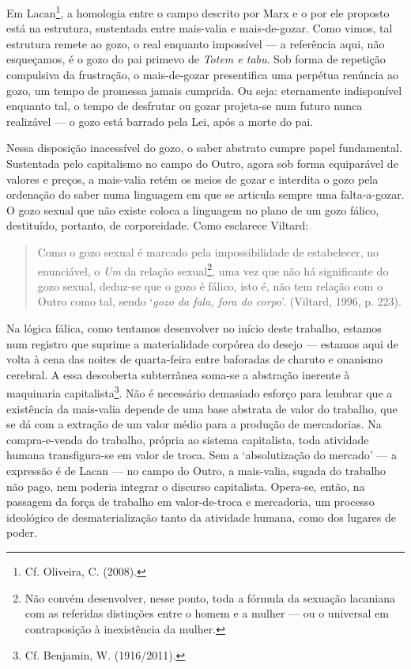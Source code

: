 Em Lacan\footnote{Cf. Oliveira, C. (2008).}, a homologia entre o campo
descrito por Marx e o por ele proposto está na estrutura, sustentada
entre mais-valia e mais-de-gozar. Como vimos, tal estrutura remete ao
gozo, o real enquanto impossível --- a referência aqui, não esqueçamos, é
o gozo do pai primevo de \emph{Totem e tabu}. Sob forma de repetição
compulsiva da frustração, o mais-de-gozar presentifica uma perpétua
renúncia ao gozo, um tempo de promessa jamais cumprida. Ou seja:
eternamente indisponível enquanto tal, o tempo de desfrutar ou gozar
projeta-se num futuro nunca realizável --- o gozo está barrado pela Lei,
após a morte do pai.

Nessa disposição inacessível do gozo, o saber abstrato cumpre papel
fundamental. Sustentada pelo capitalismo no campo do Outro, agora sob
forma equiparável de valores e preços, a mais-valia retém os meios de
gozar e interdita o gozo pela ordenação do saber numa linguagem em que
se articula sempre uma falta-a-gozar. O gozo sexual que não existe
coloca a linguagem no plano de um gozo fálico, destituído, portanto, de
corporeidade. Como esclarece Viltard:

\begin{quote}
Como o gozo sexual é marcado pela impossibilidade de estabelecer, no
enunciável, o \emph{Um} da relação sexual\footnote{Não convém
  desenvolver, nesse ponto, toda a fórmula da sexuação lacaniana com as
  referidas distinções entre o homem e a mulher --- ou o universal em
  contraposição à inexistência da mulher.}, uma vez que não há
significante do gozo sexual, deduz-se que o gozo é fálico, isto é, não
tem relação com o Outro como tal, sendo `\emph{gozo da fala, fora do
corpo}'. (Viltard, 1996, p. 223).
\end{quote}

Na lógica fálica, como tentamos desenvolver no início deste trabalho,
estamos num registro que suprime a materialidade corpórea do desejo ---
estamos aqui de volta à cena das noites de quarta-feira entre baforadas
de charuto e onanismo cerebral. A essa descoberta subterrânea soma-se a
abstração inerente à maquinaria capitalista\footnote{Cf. Benjamin, W.
  (1916/2011).}. Não é necessário demasiado esforço para lembrar que a
existência da mais-valia depende de uma base abstrata de valor do
trabalho, que se dá com a extração de um valor médio para a produção de
mercadorias. Na compra-e-venda do trabalho, própria ao sistema
capitalista, toda atividade humana transfigura-se em valor de troca. Sem
a `absolutização do mercado' --- a expressão é de Lacan --- no campo do
Outro, a mais-valia, sugada do trabalho não pago, nem poderia integrar o
discurso capitalista. Opera-se, então, na passagem da força de trabalho
em valor-de-troca e mercadoria, um processo ideológico de
desmaterialização tanto da atividade humana, como dos lugares de poder.

